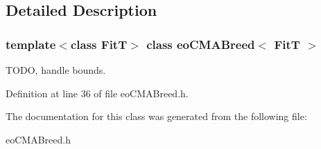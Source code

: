\subsection{Detailed Description}
\subsubsection*{template$<$class Fit\-T$>$ class eo\-CMABreed$<$ Fit\-T $>$}

TODO, handle bounds. 



Definition at line 36 of file eo\-CMABreed.h.

The documentation for this class was generated from the following file:\begin{CompactItemize}
\item 
eo\-CMABreed.h\end{CompactItemize}

